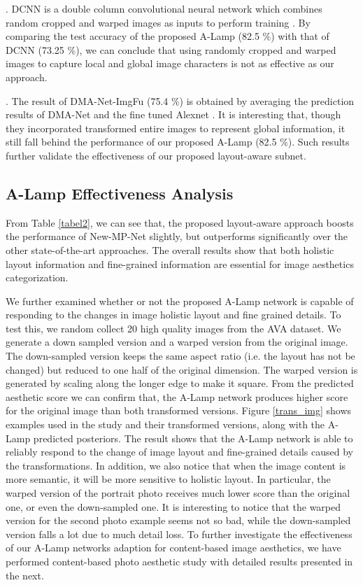 \documentclass[10pt,twocolumn,letterpaper]{article}
\begin{document}
	. DCNN \cite{Lu:2014:TMM:rating} is a double column convolutional neural network which combines random cropped and warped images as inputs to perform training . By comparing the test accuracy of the proposed A-Lamp (82.5 $\%$) with that of DCNN (73.25 $\%$), we can conclude that using randomly cropped and warped images to capture local and global image characters is not as effective as our approach.
	
	. The result of DMA-Net-ImgFu (75.4 $\%$) \cite{Lu:2015:ICCV} is obtained by averaging the prediction results of DMA-Net and the fine tuned Alexnet \cite{Alex:2012:NIPS:ImageNet}. It is interesting that, though they incorporated transformed entire images to represent global information, it still fall behind the performance of our proposed A-Lamp (82.5 $\%$). Such results further validate the effectiveness of our proposed layout-aware subnet. 
	
	
	\subsection{A-Lamp Effectiveness Analysis}
	From Table \ref{tabel2}, we can see that, the proposed layout-aware approach boosts the performance of New-MP-Net slightly, but outperforms significantly over the other state-of-the-art approaches. The overall results show that both holistic layout information and fine-grained information are essential for image aesthetics categorization. 
	
	We further examined whether or not the proposed A-Lamp network is capable of responding to the changes in image holistic layout and fine grained details. To test this, we random collect 20 high quality images from the AVA dataset. We generate a down sampled version and a warped version from the original image. The down-sampled version keeps the same aspect ratio (i.e. the layout has not be changed) but reduced to one half of the original dimension. The warped version is generated by scaling along the longer edge to make it square. From the predicted aesthetic score we can confirm that, the A-Lamp network produces higher score for the original image than both transformed versions. Figure \ref{trans_img} shows examples used in the study and their transformed versions, along with the A-Lamp predicted posteriors. The result shows that the A-Lamp network is able to reliably respond to the change of image layout and fine-grained details caused by the transformations. 
	In addition, we also notice that when the image content is more semantic, it will be more sensitive to holistic layout. In particular, the warped version of the portrait photo receives much lower score than the original one, or even the down-sampled one. It is interesting to notice that the warped version for the second photo example seems not so bad, while the down-sampled version falls a lot due to much detail loss. To further investigate the effectiveness of our A-Lamp networks adaption for content-based image aesthetics, we have performed content-based photo aesthetic study with detailed results presented in the next.
	
\end{document}
